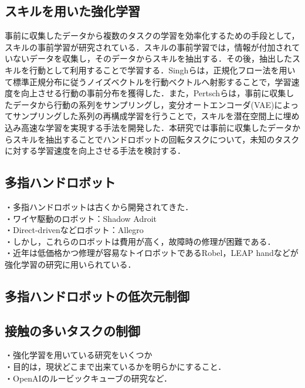 \documentclass[dvipdfmx]{ampbt_nomag}
\begin{document}
\subsection{スキルを用いた強化学習}
事前に収集したデータから複数のタスクの学習を効率化するための手段として，スキルの事前学習が研究されている．スキルの事前学習では，情報が付加されていないデータを収集し，そのデータからスキルを抽出する．その後，抽出したスキルを行動として利用することで学習する．Singhらは，正規化フロー法\cite{dinh2016density}を用いて標準正規分布に従うノイズベクトルを行動ベクトルへ射影することで，学習速度を向上させる行動の事前分布を獲得した\cite{singh2020parrot}．また，Pertschらは，事前に収集したデータから行動の系列をサンプリングし，変分オートエンコーダ(VAE)によってサンプリングした系列の再構成学習を行うことで，スキルを潜在空間上に埋め込み高速な学習を実現する手法を開発した\cite{pertsch2021accelerating}．本研究では事前に収集したデータからスキルを抽出することでハンドロボットの回転タスクについて，未知のタスクに対する学習速度を向上させる手法を検討する．

\subsection{多指ハンドロボット}
・多指ハンドロボットは古くから開発されてきた．\\
  ・ワイヤ駆動のロボット：Shadow Adroit\cite{kumar2014real}\\
  ・Direct-drivenなどロボット：Allegro\\
・しかし，これらのロボットは費用が高く，故障時の修理が困難である．\\
・近年は低価格かつ修理が容易なトイロボットであるRobel\cite{ahn2020robel}，LEAP hand\cite{shaw2023leap}などが強化学習の研究に用いられている．\\

\subsection{多指ハンドロボットの低次元制御}


\subsection{接触の多いタスクの制御}
・強化学習を用いている研究をいくつか\\
・目的は，現状どこまで出来ているかを明らかにすること．\\
・OpenAIのルービックキューブの研究など．\\
\end{document}
